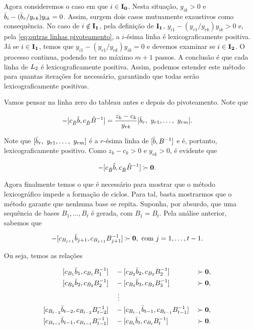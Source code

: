 Agora consideremos o caso em que $i \in  \vb{I_0}$. Nesta situação, $y_{ik} > 0$ e $\bar{b}_{i} - (\bar{b}_{r}/ y_{rk}) y_{ik} = 0$. Assim, surgem dois casos mutuamente exaustivos como consequência. No caso de $i \notin  \vb{I_1}$, pela definição de $ \vb{I_1}$, $ y_{i1} - ( y_{r1}/ y_{rk}) y_{ik} > 0$ e, pela \cref{eq:outras linhas pivoteamento}, a $i$-ésima linha é lexicograficamente positiva. Já se $i \in  \vb{I_1}$, temos que $ y_{i1} - ( y_{r1}/ y_{rk}) y_{ik} = 0$ e devemos examinar se $i \in  \vb{I_2}$. O processo continua, podendo ter no máximo $m + 1$ passos. A conclusão é que cada linha de $L_{2}$ é lexicograficamente positiva. Assim, podemos estender este método para quantas iterações for necessário, garantindo que todas serão lexicograficamente positivas.

Vamos pensar na linha zero do tableau antes e depois do pivoteamento. Note que

\begin{equation}
    [ c_B\vbbbar,  c_B\invB] - [c_{\hat{B}}\hat{\vbb}, c_{\hat{B}}\hatinvB] = \frac{ z_k - c_k}{ y_{rk}} [\bbar{r},\  y_{r1}, \ldots,\  y_{rm}].
\end{equation}

Note que $[\bar{b}_{r},\  y_{r1}, \ldots,\  y_{rm}]$ é a $r$-ésima linha de $[\bar{b}, B^{-1}]$ e é, portanto, lexicograficamente positivo. Como $z_k - c_k > 0$ e $ y_{rk} > 0$, é evidente que

\begin{equation}
    [ c_B\vbbbar,  c_B\invB] - [c_{\hat{B}}\hat{\vbb}, c_{\hat{B}}\hatinvB] \succ \vb 0.
\end{equation}

Agora finalmente temos o que é necessário para mostrar que o método lexicográfico impede a formação de ciclos. Para tal, basta mostrarmos que o método garante que nenhuma base se repita. Suponha, por absurdo, que uma sequência de bases $ B_{1},\ldots, B_{t}$ é gerada, com $ B_{1} =  B_{t}$. Pela análise anterior, sabemos que

\begin{equation}
    [ c_{B_{j}}\bbar{j},  c_{B_{j}}\invBn{j}] - [ c_{B_{j+1}}\bbar{j+1},  c_{B_{j+1}}\invBn{j+1}] \succ \vb 0,\ \text{com } j = 1,\ldots,t-1.
\end{equation}

Ou seja, temos as relações

\begin{alignat}{3}
    [ c_{B_{1}}\bbar{1},  c_{B_{1}}\invBn{1}]& &&- [ c_{B_{2}}\bbar{2},  c_{B_{2}}\invBn{2}] &&\succ \vb 0,\\
    [ c_{B_{2}}\bbar{2},  c_{B_{2}}\invBn{2}]& &&- [ c_{B_{3}}\bbar{3},  c_{B_{3}}\invBn{3}] &&\succ \vb 0,\\
    & &&\ \vdots&&\\
    [ c_{B_{t-2}}\bbar{t-2},  c_{B_{t-2}}\invBn{t-2}]& &&- [ c_{B_{t-1}}\bbar{t-1},  c_{B_{t-1}}\invBn{t-1}] &&\succ \vb 0,\\
    [ c_{B_{t-1}}\bbar{t-1},  c_{B_{t-1}}\invBn{t-1}]& &&- [ c_{B_{t}}\bbar{t},  c_{B_{t}}\invBn{t}] &&\succ \vb 0.
\end{alignat}

